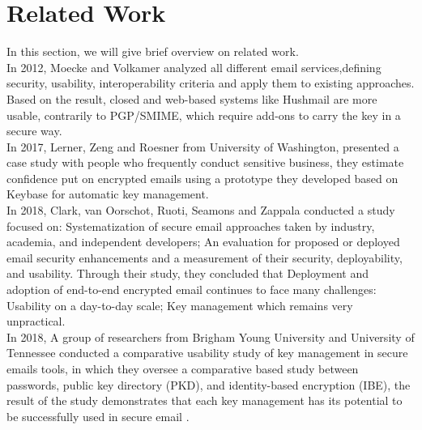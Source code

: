 \section{Related Work}
In this section, we will give brief overview on related work.\\
In 2012, Moecke and Volkamer analyzed all different email services,defining security, usability, interoperability criteria and apply them to existing approaches. Based on the result, closed and web-based systems like Hushmail are more usable, contrarily to PGP/SMIME, which require add-ons to carry the key in a secure way.\cite{usable-secure-email}\\
In 2017, Lerner, Zeng and Roesner from University of Washington, presented a case study with people who frequently conduct sensitive business, they estimate confidence put on encrypted emails using a prototype they developed based on Keybase for automatic key management.\cite{confidente}\\
In 2018, Clark, van Oorschot, Ruoti, Seamons and Zappala conducted a study focused on: Systematization of secure email approaches taken by industry, academia, and independent developers; An evaluation for proposed or deployed email security enhancements and a measurement of their security, deployability, and usability. Through their study, they concluded that Deployment and adoption of end-to-end encrypted email continues to face many challenges: Usability on a day-to-day scale; Key management which remains very unpractical.\cite{secure-email}\\
In 2018, A group of researchers from Brigham Young University and University of Tennessee conducted a comparative usability study of key management in secure emails tools, in which they oversee a comparative based study between passwords, public key directory (PKD), and identity-based encryption (IBE), the result of the study demonstrates that each key management has its potential to be successfully used in secure email \cite{comparativestudy}.


